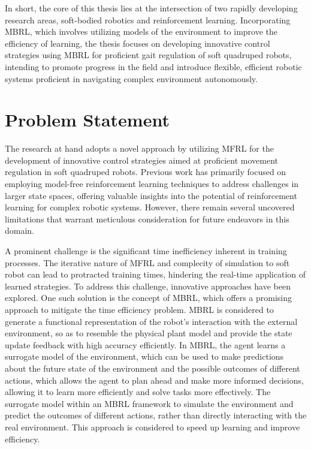 In short, the core of this thesis lies at the intersection of two rapidly developing research areas, soft-bodied robotics and reinforcement learning. Incorporating \ac{MBRL}, which involves utilizing models of the environment to improve the efficiency of learning, the thesis focuses on developing innovative control strategies using \ac{MBRL} for proficient gait regulation of soft quadruped robots, intending to promote progress in the field and introduce flexible, efficient robotic systems proficient in navigating complex environment autonomously.

\section{Problem Statement}
The research at hand adopts a novel approach by utilizing \ac{MFRL} for the development of innovative control strategies aimed at proficient movement regulation in soft quadruped robots\cite{jiSynthesizingOptimalGait2022}. Previous work has primarily focused on employing model-free reinforcement learning techniques to address challenges in larger state spaces, offering valuable insights into the potential of reinforcement learning for complex robotic systems. However, there remain several uncovered limitations that warrant meticulous consideration for future endeavors in this domain.

A prominent challenge is the significant time inefficiency inherent in training processes. The iterative nature of \ac{MFRL} and complecity of simulation to soft robot can lead to protracted training times, hindering the real-time application of learned strategies\cite{jiSynthesizingOptimalGait2022}. To address this challenge, innovative approaches have been explored. One such solution is the concept of \ac{MBRL}, which offers a promising approach to mitigate the time efficiency problem. \ac{MBRL} is considered to generate a functional representation of the robot's interaction with the external environment, so as to resemble the physical plant model and provide the state update feedback with high accuracy efficiently\cite{rayModelBasedReinforcementLearning2010}. In \ac{MBRL}, the agent learns a surrogate model of the environment, which can be used to make predictions about the future state of the environment and the possible outcomes of different actions, which allows the agent to plan ahead and make more informed decisions, allowing it to learn more efficiently and solve tasks more effectively\cite{polydorosSurveyModelBasedReinforcement2017}. The surrogate model within an MBRL framework to simulate the environment and predict the outcomes of different actions, rather than directly interacting with the real environment. This approach is considered to speed up learning and improve efficiency.

